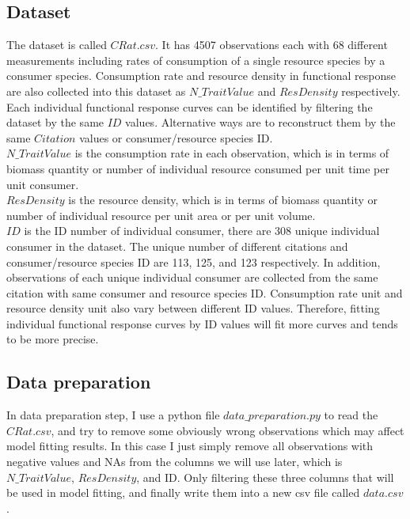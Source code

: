 \documentclass{article}[11pt,a4,twosided,doublespacing,titlepagenumber=on,numbers=endperiod]
\begin{document}
\subsection{Dataset}
The dataset is called $CRat.csv$. It has 4507 observations each with 68 different measurements including rates of consumption of a single resource species by a consumer species. Consumption rate and resource density in functional response are also collected into this dataset as $N\_TraitValue$ and $ResDensity$ respectively. Each individual functional response curves can be identified by filtering the dataset by the same $ID$ values. Alternative ways are to reconstruct them by the same $Citation$ values or consumer/resource species ID.\\
\noindent
$N\_TraitValue$ is the consumption rate in each observation, which is in terms of biomass quantity or number of individual resource consumed per unit time per unit consumer.
\\
\noindent
$ResDensity$ is the resource density, which is in terms of biomass quantity or number of individual resource per unit area or per unit volume. \\
\noindent
$ID$ is the ID number of individual consumer, there are 308 unique individual consumer in the dataset. The unique number of different citations and consumer/resource species ID are 113, 125, and 123 respectively. In addition, observations of each unique individual consumer are collected from the same citation with same consumer and resource species ID. Consumption rate unit and resource density unit also vary between different ID values. Therefore, fitting individual functional response curves by ID values will fit more curves and tends to be more precise.

\subsection{Data preparation}
In data preparation step, I use a python file $data\_preparation.py$ to read the $CRat.csv$, and try to remove some obviously wrong observations which may affect model fitting results. In this case I just simply remove all observations with negative values and NAs from the columns we will use later, which is $N\_TraitValue$, $ResDensity$, and ID. Only filtering these three columns that will be used in model fitting, and finally write them into a new csv file called $data.csv$.
\end{document}
